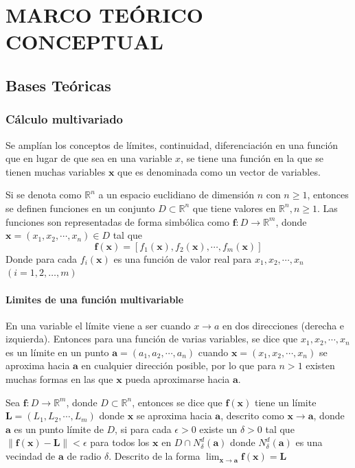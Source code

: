 \newpage
\chapter{MARCO TEÓRICO CONCEPTUAL}

\section{Bases Teóricas}

\subsection{Cálculo multivariado}
Se amplían los conceptos de límites, continuidad, diferenciación en una función que en lugar de que sea en una variable $x$, se tiene una función en la que se tienen muchas variables $\mathbf{x}$ que es denominada como un vector de variables. \citep{Khuri_2002}

Si se denota como $\mathbb{R}^n$ a un espacio euclidiano de dimensión $n$ con $n \geq 1$, entonces se definen funciones en un conjunto $D \subset \mathbb{R}^n$ que tiene valores en $\mathbb{R}^n, n \geq 1$. Las funciones son representadas de forma simbólica como $\mathbf{f}: D \rightarrow \mathbb{R}^m$, donde $\mathbf{x} = ({x}_{1},{x}_{2}, \cdots , {x}_{n}) \in D$ tal que
$$
\mathbf{f(x)}=[ {f}_{1}(\mathbf{x}), {f}_{2}(\mathbf{x}), \cdots , {f}_{m}(\mathbf{x}) ]
$$
Donde para cada ${f}_{i}(\mathbf{x})$ es una función de valor real para ${x}_{1}, {x}_{2}, \cdots, {x}_{n}$ $(i=1,2,\dots, m)$

\newpage
\subsubsection{Limites de una función multivariable}
En una variable el límite viene a ser cuando $x \rightarrow a$ en dos direcciones (derecha e izquierda). Entonces para una función de varias variables, se dice que ${x}_{1}, {x}_{2}, \cdots , {x}_{n}$ es un límite en un punto $\mathbf{a}=({a}_{1},{a}_{2}, \cdots , {a}_{n})$ cuando $\mathbf{x}=({x}_{1},{x}_{2}, \cdots , {x}_{n})$ se aproxima hacia $\mathbf{a}$ en cualquier dirección posible, por lo que para $n > 1$ existen muchas formas en las que $\mathbf{x}$ pueda aproximarse hacia $\mathbf{a}$.
\begin{definition}
	Sea $\mathbf{f}: D \rightarrow \mathbb{R}^m$, donde $D \subset \mathbb{R}^n$, entonces se dice que $\mathbf{f(x)}$ tiene un límite $\mathbf{L}=({L}_{1},{L}_{2}, \cdots , {L}_{m})$ donde $\mathbf{x}$ se aproxima hacia $\mathbf{a}$, descrito como $\mathbf{x} \rightarrow \mathbf{a}$, donde $\mathbf{a}$ es un punto límite de $D$, si para cada $\epsilon > 0$ existe un $\delta > 0$ tal que $\| \mathbf{f(x) - L} \| < \epsilon$ para todos los $\mathbf{x}$ en $D \cap {N}_{\delta}^{d}(\mathbf{a})$ donde ${N}_{\delta}^{d}(\mathbf{a})$ es una vecindad de $\mathbf{a}$ de radio $\delta$. Descrito de la forma $\lim_{\mathbf{x} \to \mathbf{a}} \mathbf{f(x) = L}$
\end{definition}
